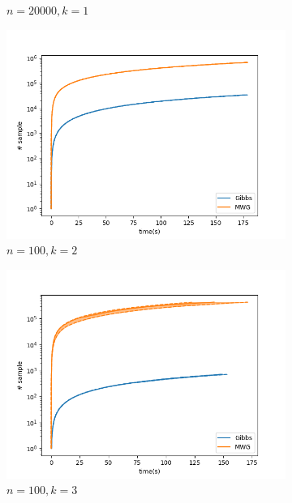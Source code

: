 \begin{figure}[H]
\begin{subfigure}{.3\textwidth}
    	\caption{$n=20000, k=1$}
	\end{subfigure}
	\begin{subfigure}{.3\textwidth}
	    \centering
    	\includegraphics[width=\linewidth]{../../plots/SampleTime_M3_N100_NMCMC3_seed0_diffind2.png}
    	\caption{$n=100, k=2$}
	\end{subfigure}
	\begin{subfigure}{.3\textwidth}
	    \centering
    	\includegraphics[width=\linewidth]{../../plots/SampleTime_M4_N100_NMCMC3_seed0_diffind2.png}
    	\caption{$n=100, k=3$}
	\end{subfigure}
	\begin{subfigure}{.3\textwidth}
	    \centering

\end{subfigure}
\end{figure}
